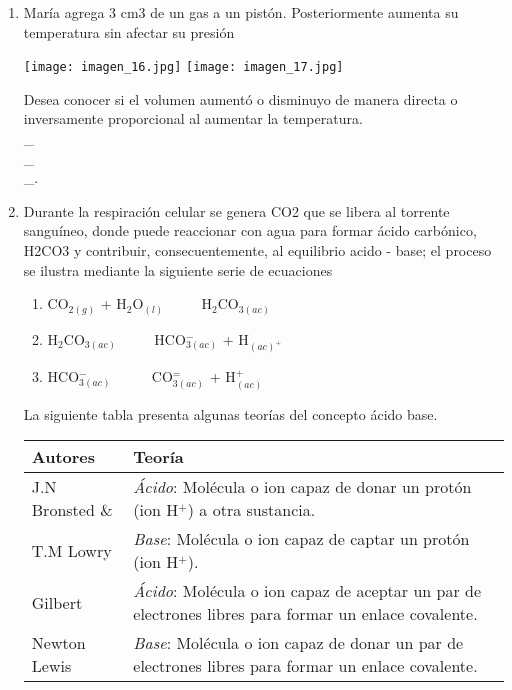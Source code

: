 \begin{enumerate}
\newpage
\item María agrega 3 cm3 de un gas a un pistón. Posteriormente aumenta su temperatura sin afectar su presión \label{mon-19}

\begin{center}
\texttt{[image: imagen\_16.jpg]}
\texttt{[image: imagen\_17.jpg]}
\end{center}

Desea conocer si el volumen aumentó o disminuyo de manera directa o inversamente proporcional al aumentar la temperatura. \hrulefill\\
\_\hrulefill\\
\_\hrulefill\\
\_\hrulefill.


\newpage
\item Durante la respiración celular se genera CO2 que se libera al torrente sanguíneo, donde puede reaccionar con agua para formar ácido carbónico, H2CO3 y contribuir, consecuentemente, al equilibrio acido - base; el proceso se ilustra mediante la siguiente serie de ecuaciones \label{mon-21}

\begin{enumerate}[(1)]
\item CO$_{2 (g)}$ + H$_2$O$_{(l)}$ $\qquad $ H$_2$CO$_{3 (ac)}$
\item   H$_2$CO$_{3 (ac)}$     $\qquad $ HCO$_{3 (ac)}^-$ + H$_{(ac)^+}$
\item  HCO$_{3 (ac)}^-$       $\qquad\ $  CO$_{3(ac)}^=$ + H$^{+}_{(ac)}$
\end{enumerate}

La siguiente tabla presenta algunas teorías del concepto ácido base.
\begin{tabular}{|p{.95in}p{2.2in}|}
\hline 
Autores & Teoría\\
\hline 
J.N Bronsted \& & \textit{Ácido}: Molécula o ion capaz de donar un protón (ion H$^{+}$) a otra sustancia. \\
T.M Lowry &\textit{Base}: Molécula o ion capaz de captar un protón (ion H$^{+}$). \\
\hline 
Gilbert & \textit{Ácido}: Molécula o ion capaz de aceptar un par de electrones libres para formar un enlace covalente. \\
\hline 
Newton  Lewis & \textit{Base}: Molécula o ion capaz de donar un par de electrones libres para formar un enlace covalente.\\
\hline 
\end{tabular} 



\end{enumerate}
